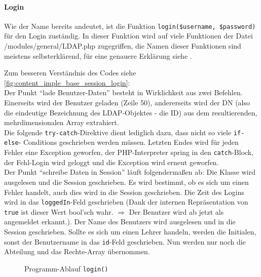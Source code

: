 \paragraph{Login\\}
Wie der Name bereits andeutet, ist die Funktion \texttt{login(\$username, \$password)} für den Login zuständig. In dieser Funktion wird auf viele Funktionen der Datei /modules/general/LDAP.php zugegriffen, die Namen dieser Funktionen sind meistens selbsterklärend, für eine genauere Erklärung siehe .

Zum besseren Verständnis des Codes siehe \autoref{fig:content_imple_base_session_login}:\\
Der Punkt \enquote{lade Benutzer-Daten} besteht in Wirklichkeit aus zwei Befehlen. Einerseits wird der Benutzer geladen (Zeile 50), andererseits wird der DN (also die eindeutige Bezeichnung des LDAP-Objektes - die ID) aus dem resultierenden, mehrdimensionalen Array extrahiert.\\
Die folgende \texttt{try-catch}-Direktive dient lediglich dazu, dass nicht so  viele \texttt{if-else}- Conditions geschrieben werden müssen. Letzten Endes wird für jeden Fehler eine Exception geworfen, der PHP-Interpreter spring in den \texttt{catch}-Block, der Fehl-Login wird geloggt und die Exception wird erneut geworfen.\\
Der Punkt \enquote{schreibe Daten in Session} läuft folgendermaßen ab: Die Klasse wird ausgelesen und die Session geschrieben. Es wird bestimmt, ob es sich um einen Fehler handelt, auch dies wird in die Session geschrieben. Die Zeit des Logins wird in das \texttt{loggedIn}-Feld geschrieben (Dank der internen Repräsentation von \texttt{true} ist dieser Wert bool'sch wahr. $ \Longrightarrow $ Der Benutzer wird ab jetzt als angemeldet erkannt.). Der Name des Benutzers wird ausgelesen und in die Session geschrieben. Sollte es sich um einen Lehrer handeln, werden die Initialen, sonst der Benutzername in das \texttt{id}-Feld geschrieben. Nun werden nur noch die Abteilung und das Rechte-Array übernommen.
\begin{figure}[H]
\centering
\caption{Programm-Ablauf \texttt{login()}}
\label{fig:content_imple_base_session_login}
\end{figure}

